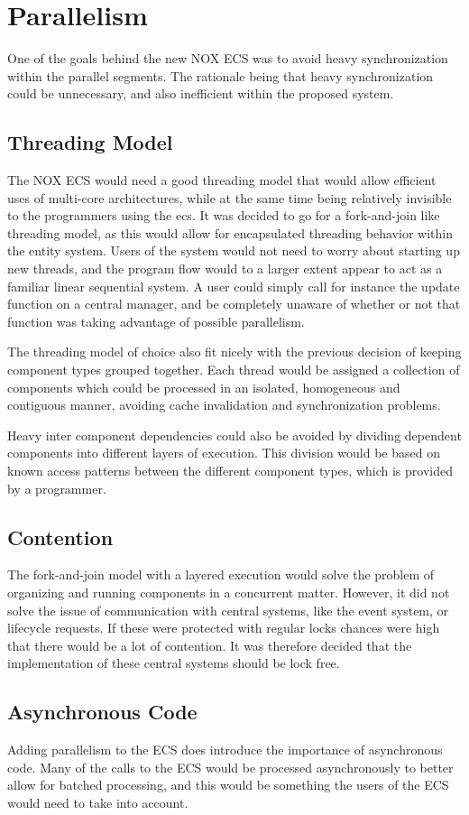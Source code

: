 \section{Parallelism}
One of the goals behind the new NOX ECS was to avoid heavy synchronization within the parallel segments.
The rationale being that heavy synchronization could be unnecessary, and also inefficient within the proposed system.

\subsection{Threading Model}
\label{subsubsec:high_level_threading_model}
The NOX ECS would need a good threading model that would allow efficient uses of multi-core
architectures, while at the same time being relatively invisible to the programmers
using the ecs.
It was decided to go for a fork-and-join like threading model\cite[p. 369]{game_engine_architecture},
as this would allow for encapsulated threading behavior within the entity system.
Users of the system would not need to worry about starting up new threads,
and the program flow would to a larger extent appear to act as a familiar linear sequential system.
A user could simply call for instance the update function on a central manager, and be completely
unaware of whether or not that function was taking advantage of possible parallelism.

The threading model of choice also fit nicely with the previous decision of keeping component types
grouped together.
Each thread would be assigned a collection of components which could be processed in an isolated,
homogeneous and contiguous manner, avoiding cache invalidation and synchronization problems.

Heavy inter component dependencies could also be avoided by dividing dependent components
into different layers of execution.
This division would be based on known access patterns between the different component types,
which is provided by a programmer.

\subsection{Contention}
The fork-and-join model with a layered execution would solve the problem of organizing and running components
in a concurrent matter.
However, it did not solve the issue of communication with central systems, like the event system, or lifecycle requests.
If these were protected with regular locks chances were high that there would be a lot of contention.
It was therefore decided that the implementation of these central systems should be lock free.

\subsection{Asynchronous Code}
Adding parallelism to the ECS does introduce the importance of asynchronous code.
Many of the calls to the ECS would be processed asynchronously to better allow for batched
processing, and this would be something the users of the ECS would need to take into account.
